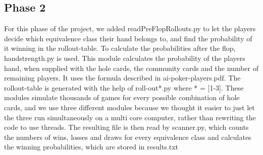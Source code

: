 \documentclass[titlepage]{article}
\begin{document}
	\subsection{Phase 2}
		For this phase of the project, we added readPreFlopRollouts.py to let the players decide which equivalence class their hand belongs to, and find the probability of it winning in the rollout-table. To calculate the probabilities after the flop, handstrength.py is used. This module calculates the probability of the players hand, when supplied with the hole cards, the community cards and the number of remaining players. It uses the formula described in ai-poker-players.pdf. The rollout-table is generated with the help of roll-out*.py where * = [1-3]. These modules simulate thousands of games for every possible combination of hole cards, and we use three different modules because we thought it easier to just let the three run simultaneously on a multi core computer, rather than rewriting the code to use threads. The resulting file is then read by scanner.py, which counts the numbers of wins, losses and draws for every equivalence class and calculates the winning probabilities, which are stored in results.txt
\end{document}

